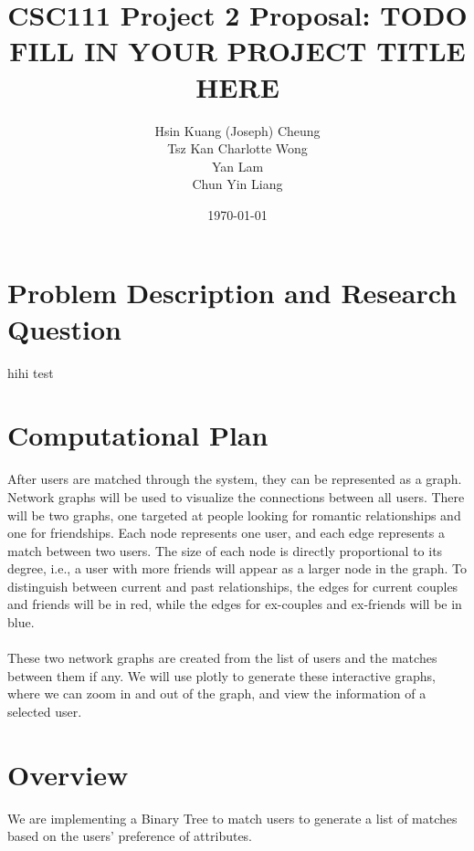 \documentclass[fontsize=11pt]{article}
\title{CSC111 Project 2 Proposal: TODO FILL IN YOUR PROJECT TITLE HERE}
\author{Hsin Kuang (Joseph) Cheung \\ Tsz Kan Charlotte Wong \\ Yan Lam \\ Chun Yin Liang}
\date{\today}
\begin{document}
\maketitle

\section*{Problem Description and Research Question}

hihi
test

\section*{Computational Plan}

After users are matched through the system, they can be represented as a graph. Network graphs will be used to visualize the connections between all users. There will be two graphs, one targeted at people looking for romantic relationships and one for friendships. Each node represents one user, and each edge represents a match between two users. The size of each node is directly proportional to its degree, i.e., a user with more friends will appear as a larger node in the graph. To distinguish between current and past relationships, the edges for current couples and friends will be in red, while the edges for ex-couples and ex-friends will be in blue.
\\
\\
These two network graphs are created from the list of users and the matches between them if any. We will use plotly to generate these interactive graphs, where we can zoom in and out of the graph, and view the information of a selected user.

\section{Overview}
We are implementing a Binary Tree to match users to generate a list of matches based on the users’ preference of attributes.
\end{document}
